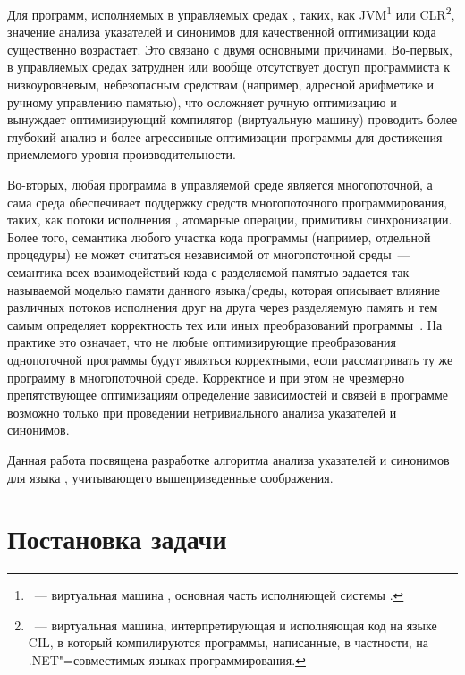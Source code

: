 \documentclass[14pt,titlepage,draft]{extarticle}
\newcommand{\java}{\eng{Java}\xspace}
\begin{document}
    Для программ, исполняемых в управляемых средах , таких, как JVM\footnote{~---
    виртуальная машина \java, основная часть исполняющей системы \java.} или
    CLR\footnote{~--- виртуальная машина,
    интерпретирующая и исполняющая код на языке CIL, в который компилируются
    программы, написанные, в частности, на .NET"=совместимых языках
    программирования.}, значение анализа указателей и синонимов для
    качественной оптимизации кода существенно возрастает. Это связано с двумя
    основными причинами. Во-первых, в управляемых средах затруднен или вообще
    отсутствует доступ программиста к низкоуровневым, небезопасным средствам
    (например, адресной арифметике и ручному управлению памятью), что
    осложняет ручную оптимизацию и вынуждает оптимизирующий компилятор
    (виртуальную машину) проводить более глубокий анализ и более агрессивные
    оптимизации программы для достижения приемлемого уровня производительности.

    Во-вторых, любая программа в управляемой среде является многопоточной, а
    сама среда обеспечивает поддержку средств многопоточного программирования,
    таких, как потоки исполнения , атомарные операции,
    примитивы синхронизации. Более того, семантика любого участка кода
    программы (например, отдельной процедуры) не может считаться
    независимой от многопоточной среды~--- семантика всех взаимодействий кода с
    разделяемой памятью задается так называемой моделью памяти данного
    языка\slash{}среды, которая описывает влияние различных потоков исполнения друг на
    друга через разделяемую память и тем самым определяет корректность тех или
    иных преобразований программы~\cite{manson_jmm}. На практике это означает,
    что не любые оптимизирующие преобразования однопоточной программы будут
    являться корректными, если рассматривать ту же программу в многопоточной
    среде. Корректное и при этом не чрезмерно препятствующее оптимизациям
    определение зависимостей и связей в программе возможно только при
    проведении нетривиального анализа указателей и синонимов.

    Данная работа посвящена разработке алгоритма анализа указателей и синонимов
    для языка \java, учитывающего вышеприведенные соображения.

  \section{Постановка задачи}
\end{document}

